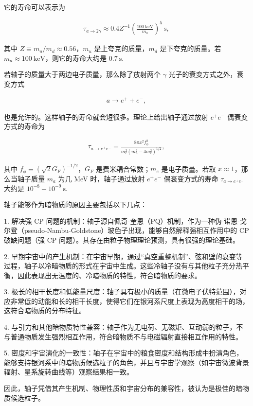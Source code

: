 \documentclass{beamer} %
\begin{document}
\begin{frame}
它的寿命可以表示为

\begin{align}
\tau_{a\to 2\gamma}
\approx 0.4 Z^{-1} \left(\frac{100~\mathrm{keV} }{m_a }  \right)^5~\mathrm{s},
\end{align}

其中 $Z\equiv m_u/m_d \approx 0.56$，$m_u$ 是上夸克的质量，$m_d$ 是下夸克的质量。若 $m_a\approx 100~\mathrm{keV}$，则它的寿命大约是 $0.7~\mathrm{s} .$

若轴子的质量大于两边电子质量，那么除了放射两个 $\gamma$ 光子的衰变方式之外，衰变方式

\begin{align}
a \to e^+ + e^-,
\end{align}

也是允许的。这样轴子的寿命就会短很多。理论上给出轴子通过放射 $e^+ e^-$ 偶衰变方式的寿命为
\end{frame}

\begin{frame}
\begin{align}
\tau_{a\to e^+ e^-}
=\frac{8 \pi x^2 f_\phi^2}{m_e^2\left(m_a^2-4m_e^2 \right)^{1/2} } ,
\end{align}

其中 $f_\phi\equiv \left(\sqrt{2} G_F \right)^{-1/2}$，$G_F$ 是费米耦合常数；$m_e$ 是电子质量。若取 $x\approx 1$，那么当轴子质量 $m_a$ 为几 MeV 时，轴子通过放射 $e^+ e^-$ 偶衰变方式的寿命 $\tau_{a\to e^+ e^-}$ 大约是 $10^{-8} - 10^{-9}~\mathrm{s} .$
\end{frame}

\begin{frame}
轴子能够作为暗物质的原因主要包括以下几点：

1. 解决强 CP 问题的机制：轴子源自佩奇-奎恩（PQ）机制，作为一种伪-诺恩-戈尔登（pseudo-Nambu-Goldstone）玻色子出现，能够自然解释强相互作用中的 CP 破缺问题（强 CP 问题）。其存在由粒子物理理论预测，具有很强的理论基础。

2. 早期宇宙中的产生机制：在宇宙早期，通过“真空重整机制”、弦和壁的衰变等过程，轴子以冷暗物质的形式在宇宙中生成。这些冷轴子没有与其他粒子充分热平衡，因此表现出无温度的、冷暗物质的特性，符合暗物质的要求。

3. 极长的相干长度和低能量尺度：轴子具有极小的质量（在微电子伏特范围），对应非常低的动能和长的相干长度，使得它们在银河系尺度上表现为高度相干的场，这符合暗物质的分布特征。
\end{frame}

\begin{frame}
4. 与引力和其他暗物质特性兼容：轴子作为无电荷、无磁矩、互动弱的粒子，不与普通物质发生强烈相互作用，符合暗物质不与电磁辐射直接相互作用的特性。

5. 密度和宇宙演化的一致性：轴子在宇宙中的粮食密度和结构形成中扮演角色，能够支持银河系中的暗物质候选粒子的角色，并且与宇宙学观察（如宇宙微波背景辐射、星系旋转曲线等）观察结果相一致。

因此，轴子凭借其产生机制、物理性质和宇宙分布的兼容性，被认为是极佳的暗物质候选粒子。
\end{frame}
\end{document}
